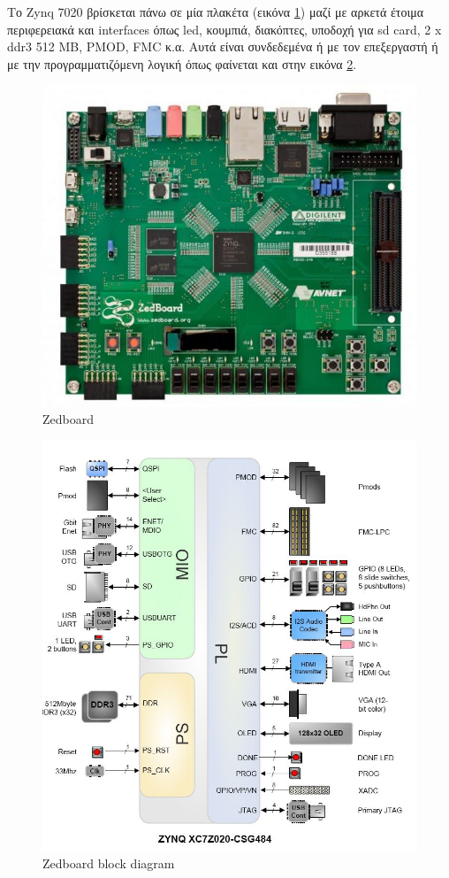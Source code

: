 \documentclass[12pt,a4paper]{book}
\begin{document}
Το Zynq 7020 βρίσκεται πάνω σε μία πλακέτα (εικόνα \ref{zedboard}) μαζί με αρκετά έτοιμα περιφερειακά και interfaces όπως led, κουμπιά, διακόπτες, υποδοχή για sd card, 2 x ddr3 512 MB, PMOD, FMC κ.α. Αυτά είναι συνδεδεμένα ή με τον επεξεργαστή ή με την προγραμματιζόμενη λογική όπως φαίνεται και στην εικόνα \ref{zed_periph}.
\begin{figure}
	\centering
	\includegraphics[width=\textwidth]{zedboard}
	\caption{Zedboard}
	\label{zedboard}
\end{figure}

\begin{figure}
	\centering
	\includegraphics[width=\textwidth]{zed_periph}
	\caption{Zedboard block diagram}
	\label{zed_periph}
\end{figure}
\end{document}
